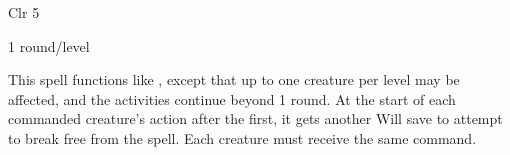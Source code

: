 
\begin{description*}
\item[Level:] Clr 5
\item[Duration:] 1 round/level
\end{description*}

This spell functions like , except that up to one creature per
level may be affected, and the activities continue beyond 1 round. At the start
of each commanded creature's action after the first, it gets another Will save
to attempt to break free from the spell. Each creature must receive the same command.